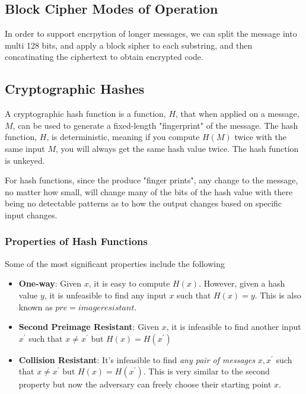 \documentclass{article}
\begin{document}
\subsection{Block Cipher Modes of Operation}
In order to support encrpytion of longer messages, we can split the message into multi 128 bits, and apply a block sipher to each substring, and then concatinating the ciphertext to obtain encrypted code.

\subsection{Cryptographic Hashes}
\begin{definition}
    A cryptographic hash function is a function, $H$, that when applied on a message, $M$, can be used to generate a fixed-length "fingerprint" of the message. The hash function, $H$, is deterministic, meaning if you compute $H(M)$ twice with the same input $M$, you will always get the same hash value twice. The hash function is unkeyed.
\end{definition}

For hash functions, since the produce "finger prints", any change to the message, no matter how small, will change many of the bits of the hash value with there being no detectable patterns as to how the output changes based on specific input changes.

\subsubsection{Properties of Hash Functions}
Some of the most significant properties include the following
\begin{itemize}
    \item \textbf{One-way}: Given $x$, it is easy to compute $H(x)$. However, given a hash value $y$, it is unfeasible to find any input $x$ such that $H(x) = y$. This is also known as $pre=image resistant$.
    \item \textbf{Second Preimage Resistant}: Given $x$, it is infeasible to find another input $x^\prime$ such that $x \neq x^\prime$ but $H(x) = H(x^\prime)$
    \item \textbf{Collision Resistant}: It's infeasible to find \emph{any pair of messages} $x, x^\prime$ such that $x \neq x^\prime$ but $H(x) = H(x^\prime)$. This is very similar to the second property but now the adversary can freely choose their starting point $x$.
\end{itemize}
\end{document}
